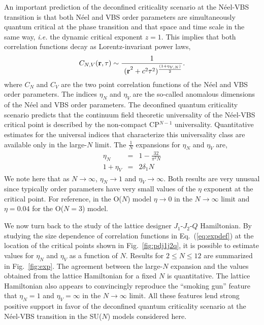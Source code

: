 \documentclass[range]{ar2e}
\begin{document}
An important prediction of the deconfined criticality scenario at the
N\'eel-VBS transition is that both N\'eel and VBS order parameters are
simultaneously quantum critical at the phase transition and that space
and time scale in the same way, {\em i.e.} the dynamic critical exponent $z=1$. This implies
that both correlation functions decay as Lorentz-invariant power laws,
\begin{equation}
\label{eq:expdef}
C_{N,V} ({\bf r},\tau) \sim  \frac{1}{~{(\bf r}^2+c^2\tau^2)^{\frac{(1+\eta_{V,N})}{2}}}.
\end{equation}
 where $C_N$ and $C_V$ are the two point correlation functions of the
 N\'eel and VBS order parameters. The indices $\eta_N$ and $\eta_V$
 are the so-called anomalous dimensions of the N\'eel and VBS order
 parameters. The deconfined quantum criticality scenario predicts that
 the continuum field theoretic universality of the N\'eel-VBS critical
 point is described by the non-compact CP$^{N-1}$ universality. Quantitative
 estimates for the universal indices that characterize this
 universality class are available only in the large-$N$
 limit. The $\frac{1}{N}$ expansions for $\eta_N$ and $\eta_V$ are,
\begin{eqnarray}
\label{eq:oneonN}
\eta_N &=& 1 - \frac{32}{\pi^2N}\nonumber\\
1+\eta_V &=& 2 \delta_1 N
\end{eqnarray}
We note here that as $N\rightarrow\infty$, $\eta_N \rightarrow 1$ and
$\eta_V\rightarrow \infty$. Both results are very unusual since
typically order parameters have very small values of the $\eta$
exponent at the critical point. For reference, in the O($N$) model $\eta\rightarrow
0$ in the $N\rightarrow\infty$ limit and $\eta=0.04$ for the O($N=3$) model.

We now turn back to the study of the lattice designer $J_1$-$J_2$-$Q$
Hamiltonian. By studying the size dependence of correlation functions in Eq.~(\ref{eq:expdef})
 at the location of the critical points shown in Fig.~\ref{fig:pdj1j2q}, it is possible to
 estimate values for $\eta_N$ and $\eta_V$ as a function
 of $N$. Results for $2\leq N \leq 12$ are summarized in Fig.~\ref{fig:exp}. The
 agreement between the large-$N$ expansion and the values obtained from the
 lattice Hamiltonian for a fixed $N$ is quantitative. The lattice
 Hamiltonian also appears to convincingly reproduce the ``smoking gun'' feature that
 $\eta_N=1$ and $\eta_V=\infty$ in the $N\rightarrow \infty$
 limit. All these features lend strong positive support in favor of
 the deconfined quantum criticality scenario at the N\'eel-VBS
 transition in the SU($N$) models considered here.
\end{document}
